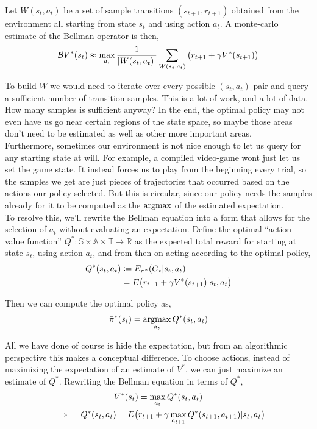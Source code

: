 Let $W(s_t, a_t)$ be a set of sample transitions $(s_{t+1}, r_{t+1})$ obtained from the environment all starting from state $s_t$ and using action $a_t$. A monte-carlo estimate of the Bellman operator is then,
\begin{equation*}
\mathcal{B}V^*(s_t) \approx \max_{a_t} \frac{1}{|W(s_t,a_t)|} \sum_{W(s_t,a_t)} \big{(}r_{t+1} + \gamma V^*(s_{t+1})\big{)}
\end{equation*}

To build $W$ we would need to iterate over every possible $(s_t, a_t)$ pair and query a sufficient number of transition samples. This is a lot of work, and a lot of data. How many samples is sufficient anyway? In the end, the optimal policy may not even have us go near certain regions of the state space, so maybe those areas don't need to be estimated as well as other more important areas.\\

Furthermore, sometimes our environment is not nice enough to let us query for any starting state at will. For example, a compiled video-game wont just let us set the game state. It instead forces us to play from the beginning every trial, so the samples we get are just pieces of trajectories that occurred based on the actions our policy selected. But this is circular, since our policy needs the samples already for it to be computed as the $\operatorname*{argmax}$ of the estimated expectation.\\

To resolve this, we'll rewrite the Bellman equation into a form that allows for the selection of $a_t$ without evaluating an expectation. Define the optimal ``action-value function'' $Q^*:\mathbb{S}\times\mathbb{A}\times\mathbb{T} \to \mathbb{R}$ as the expected total reward for starting at state $s_t$, using action $a_t$, and from then on acting according to the optimal policy,
\begin{align*}
Q^*(s_t, a_t) &\coloneqq E_{\pi^*}(G_t | s_t, a_t)\\
&= E\big{(}r_{t+1} + \gamma V^*(s_{t+1}) | s_t, a_t\big{)}
\end{align*}

Then we can compute the optimal policy as,
\begin{equation*}
\bar{\pi}^*(s_t) = \operatorname*{argmax}_{a_t} Q^*(s_t, a_t)
\end{equation*}

All we have done of course is hide the expectation, but from an algorithmic perspective this makes a conceptual difference. To choose actions, instead of maximizing the expectation of an estimate of $V^*$, we can just maximize an estimate of $Q^*$. Rewriting the Bellman equation in terms of $Q^*$,
\begin{gather*}
V^*(s_t) = \max_{a_t} Q^*(s_t, a_t)\\
\implies\ \ \ Q^*(s_t, a_t) = E\big{(}r_{t+1} + \gamma \max_{a_{t+1}} Q^*(s_{t+1}, a_{t+1}) | s_t, a_t\big{)}
\end{gather*}

